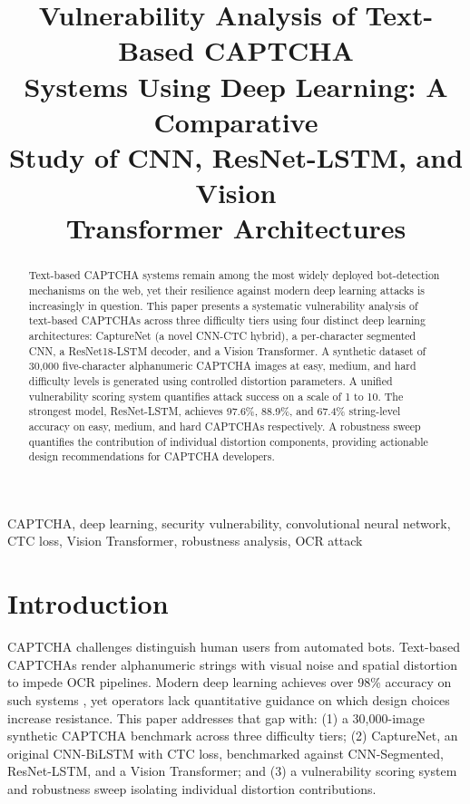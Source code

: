 ﻿\documentclass[conference]{IEEEtran}
\begin{document}
\title{Vulnerability Analysis of Text-Based CAPTCHA\\
Systems Using Deep Learning: A Comparative\\
Study of CNN, ResNet-LSTM, and Vision\\
Transformer Architectures
}

\author{
}

\maketitle

\begin{abstract}
Text-based CAPTCHA systems remain among the most widely deployed bot-detection mechanisms on the web, yet their resilience against modern deep learning attacks is increasingly in question. This paper presents a systematic vulnerability analysis of text-based CAPTCHAs across three difficulty tiers using four distinct deep learning architectures: CaptureNet (a novel CNN-CTC hybrid), a per-character segmented CNN, a ResNet18-LSTM decoder, and a Vision Transformer. A synthetic dataset of 30,000 five-character alphanumeric CAPTCHA images at easy, medium, and hard difficulty levels is generated using controlled distortion parameters. A unified vulnerability scoring system quantifies attack success on a scale of 1 to 10. The strongest model, ResNet-LSTM, achieves 97.6\%, 88.9\%, and 67.4\% string-level accuracy on easy, medium, and hard CAPTCHAs respectively. A robustness sweep quantifies the contribution of individual distortion components, providing actionable design recommendations for CAPTCHA developers.
\end{abstract}

\begin{IEEEkeywords}
CAPTCHA, deep learning, security vulnerability, convolutional neural network, CTC loss, Vision Transformer, robustness analysis, OCR attack
\end{IEEEkeywords}

\section{Introduction}
CAPTCHA challenges \cite{b1} distinguish human users from automated bots. Text-based CAPTCHAs render alphanumeric strings with visual noise and spatial distortion to impede OCR pipelines. Modern deep learning achieves over 98\% accuracy on such systems \cite{b2,b3}, yet operators lack quantitative guidance on which design choices increase resistance. This paper addresses that gap with: (1) a 30,000-image synthetic CAPTCHA benchmark across three difficulty tiers; (2) CaptureNet, an original CNN-BiLSTM with CTC loss, benchmarked against CNN-Segmented, ResNet-LSTM, and a Vision Transformer; and (3) a vulnerability scoring system and robustness sweep isolating individual distortion contributions.
\end{document}
